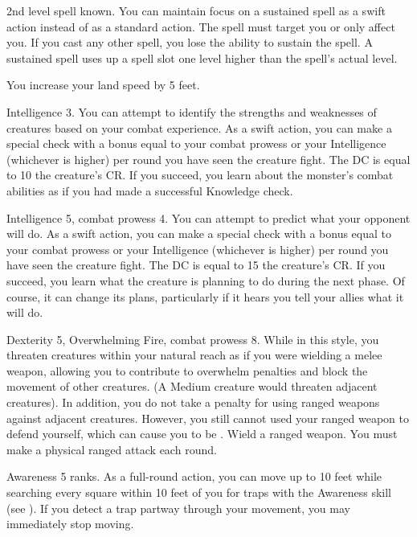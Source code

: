 \featpre 2nd level spell known.
\featben You can maintain focus on a sustained spell as a swift action instead of as a standard action.
The spell must target you or only affect you.
If you cast any other spell, you lose the ability to sustain the spell.
A sustained spell uses up a spell slot one level higher than the spell's actual level.

\featben You increase your land speed by 5 feet.

\featpre Intelligence 3.
\featben You can attempt to identify the strengths and weaknesses of creatures based on your combat experience.
As a swift action, you can make a special check with a bonus equal to your combat prowess or your Intelligence (whichever is higher)  per round you have seen the creature fight.
The DC is equal to 10 \add the creature's CR.
If you succeed, you learn about the monster's combat abilities as if you had made a successful Knowledge check.

\featpres Intelligence 5, combat prowess 4.
\featben You can attempt to predict what your opponent will do.
As a swift action, you can make a special check with a bonus equal to your combat prowess or your Intelligence (whichever is higher)  per round you have seen the creature fight.
The DC is equal to 15 \add the creature's CR.
If you succeed, you learn what the creature is planning to do during the next phase.
Of course, it can change its plans, particularly if it hears you tell your allies what it will do.

\featpres Dexterity 5, Overwhelming Fire, combat prowess 8.
\featben While in this style, you threaten creatures within your natural reach as if you were wielding a melee weapon, allowing you to contribute to overwhelm penalties and block the movement of other creatures.
(A Medium creature would threaten adjacent creatures).
In addition, you do not take a  penalty for using ranged weapons against adjacent creatures.
However, you still cannot used your ranged weapon to defend yourself, which can cause you to be .
\stylereq Wield a ranged weapon.
You must make a physical ranged attack each round.

\featpre Awareness 5 ranks.
\featben As a full-round action, you can move up to 10 feet while searching every square within 10 feet of you for traps with the Awareness skill (see ).
If you detect a trap partway through your movement, you may immediately stop moving.

